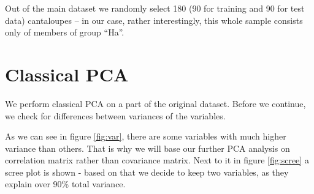 \documentclass[12pt]{article}
\begin{document}
Out of the main dataset we randomly select 180 (90 for training and 90 for test data) cantaloupes -- in our case,
rather interestingly, this whole sample consists only of members of group ``Ha''. 

\section{Classical PCA} \label{classicPCA}
We perform classical PCA on a part of the original dataset. Before we continue, we check for differences between variances of the variables.

As we can see in figure \ref{fig:var}, there are some variables with much higher variance than others. That is why we will base our further PCA analysis on correlation matrix rather than
covariance matrix. Next to it in figure \ref{fig:scree} a scree plot is shown - based on that we decide to keep two variables, as they explain over 90\% total variance.
\end{document}
